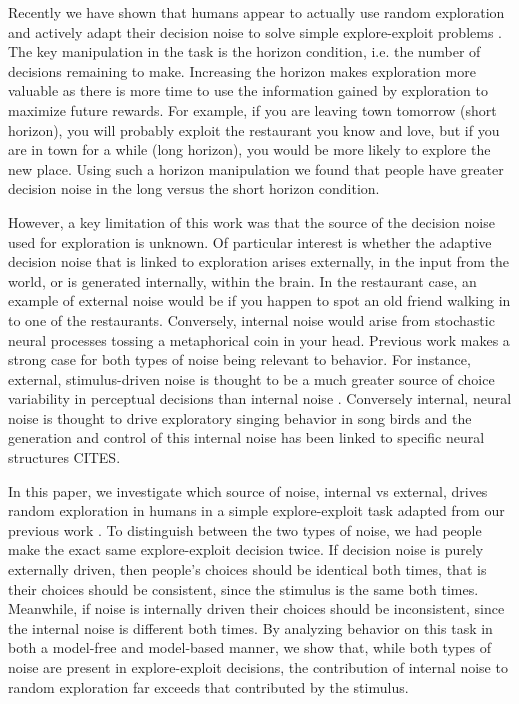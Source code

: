 \documentclass[12pt]{article}
\begin{document}
	Recently we have shown that humans appear to actually use random exploration and actively adapt their decision noise to solve simple explore-exploit problems \citep{wilson2014}.  The key manipulation in the task is the horizon condition, i.e. the number of decisions remaining to make. Increasing the horizon makes exploration more valuable as there is more time to use the information gained by exploration to maximize future rewards. For example, if you are leaving town tomorrow (short horizon), you will probably exploit the restaurant you know and love, but if you are in town for a while (long horizon), you would be more likely to explore the new place. Using such a horizon manipulation we found that people have greater decision noise in the long versus the short horizon condition. 
	
	
	However, a key limitation of this work was that the source of the decision noise used for exploration is unknown. Of particular interest is whether the adaptive decision noise that is linked to exploration arises externally, in the input from the world, or is generated internally, within the brain. In the restaurant case, an example of external noise would be if you happen to spot an old friend walking in to one of the restaurants. Conversely, internal noise would arise from stochastic neural processes tossing a metaphorical coin in your head. Previous work makes a strong case for both types of noise being relevant to behavior. For instance, external, stimulus-driven noise is thought to be a much greater source of choice variability in perceptual decisions than internal noise \citep{eeBrunton13}. Conversely internal, neural noise is thought to drive exploratory singing behavior in song birds  \citep{songbird2} and the generation and control of this internal noise has been linked to specific neural structures CITES. 
	
	In this paper, we investigate which source of noise, internal vs external, drives random exploration in humans in a simple explore-exploit task adapted from our previous work \citep{wilson2014}. To distinguish between the two types of noise, we had people make the exact same explore-exploit decision twice. If decision noise is purely externally driven, then people's choices should be identical both times, that is their choices should be consistent, since the stimulus is the same both times. Meanwhile, if noise is internally driven their choices should be inconsistent, since the internal noise is different both times. By analyzing behavior on this task in both a model-free and model-based manner, we show that, while both types of noise are present in explore-exploit decisions, the contribution of internal noise to random exploration far exceeds that contributed by the stimulus.
	
\end{document}
